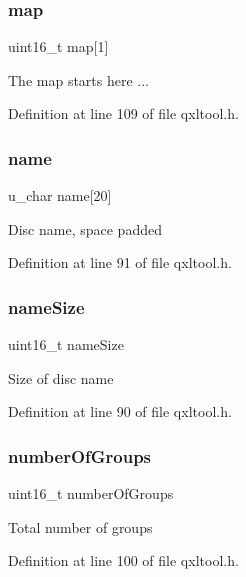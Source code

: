 \subsubsection{\texorpdfstring{map}{map}}
{\footnotesize\ttfamily uint16\+\_\+t map\mbox{[}1\mbox{]}}

The map starts here ... 

Definition at line 109 of file qxltool.\+h.

\mbox{\label{struct_h_e_a_d_e_r_a09712874ff8b1883dffe908ad2337d05}} 
\subsubsection{\texorpdfstring{name}{name}}
{\footnotesize\ttfamily u\+\_\+char name\mbox{[}20\mbox{]}}

Disc name, space padded 

Definition at line 91 of file qxltool.\+h.

\mbox{\label{struct_h_e_a_d_e_r_a0b15bb8f9aee33d3e49dcd95093bf88a}} 
\subsubsection{\texorpdfstring{name\+Size}{nameSize}}
{\footnotesize\ttfamily uint16\+\_\+t name\+Size}

Size of \textquotesingle{}disc\textquotesingle{} name 

Definition at line 90 of file qxltool.\+h.

\mbox{\label{struct_h_e_a_d_e_r_a0d376f9b00a3d00a747929a325a5ca35}} 
\subsubsection{\texorpdfstring{number\+Of\+Groups}{numberOfGroups}}
{\footnotesize\ttfamily uint16\+\_\+t number\+Of\+Groups}

Total number of groups 

Definition at line 100 of file qxltool.\+h.

